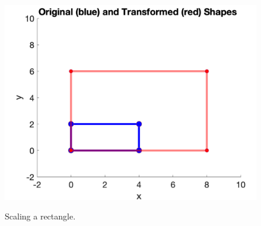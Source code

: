 \documentclass[12pt,letter]{article}
\begin{document}
\begin{figure}[ht]
	\begin{center}
		{\includegraphics[width=.70\textwidth]{figs/plot}}
	\end{center}
	\caption{Scaling a rectangle. }
	\label{fig_plot}
\end{figure}



 

\end{document}
